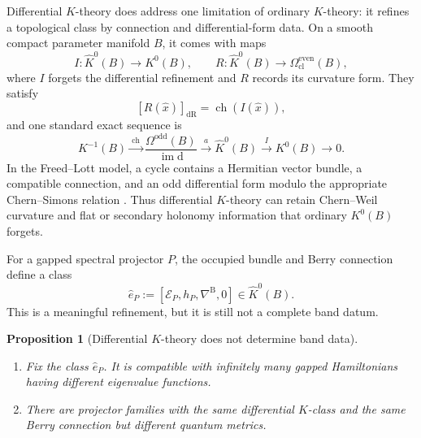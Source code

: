 \documentclass[11pt]{article}
\newtheorem{proposition}[theorem]{Proposition}
\theoremstyle{definition}
\theoremstyle{remark}
\newcommand{\ch}{\operatorname{ch}}
\newcommand{\dd}{\mathrm d}
\begin{document}
Differential \(K\)-theory does address one limitation of ordinary
\(K\)-theory: it refines a topological class by connection and
differential-form data.  On a smooth compact parameter manifold \(B\), it
comes with maps
\[
 I:\widehat K^0(B)\longrightarrow K^0(B),
 \qquad
 R:\widehat K^0(B)\longrightarrow
      \Omega_{\mathrm{cl}}^{\mathrm{even}}(B),
 \tag{9.8}\label{eq:differential-k-maps}
\]
where \(I\) forgets the differential refinement and \(R\) records its
curvature form.  They satisfy
\[
       [R(\widehat x)]_{\mathrm{dR}}
          =\ch\!\left(I(\widehat x)\right),
 \tag{9.9}\label{eq:differential-k-curvature}
\]
and one standard exact sequence is
\[
 K^{-1}(B)\xrightarrow{\ \ch\ }
 \frac{\Omega^{\mathrm{odd}}(B)}{\operatorname{im}\dd}
 \xrightarrow{\ a\ }\widehat K^0(B)
 \xrightarrow{\ I\ }K^0(B)\longrightarrow0.
 \tag{9.10}\label{eq:differential-k-sequence}
\]
In the Freed--Lott model, a cycle contains a Hermitian vector bundle, a
compatible connection, and an odd differential form modulo the appropriate
Chern--Simons relation \cite{FreedLott}.  Thus differential \(K\)-theory can
retain Chern--Weil curvature and flat or secondary holonomy information that
ordinary \(K^0(B)\) forgets.

For a gapped spectral projector \(P\), the occupied bundle and Berry
connection define a class
\[
 \widehat e_P
   :=[\mathscr E_P,h_P,\nabla^{\mathrm B},0]
      \in\widehat K^0(B).
 \tag{9.11}\label{eq:differential-band-class}
\]
This is a meaningful refinement, but it is still not a complete band datum.

\begin{proposition}[Differential \(K\)-theory does not determine band data]
\label{prop:differential-k-not-band}
\begin{enumerate}[label=\textup{(\alph*)},leftmargin=2.5em]
\item Fix the class \(\widehat e_P\).  It is compatible with infinitely
  many gapped Hamiltonians having different eigenvalue functions.
\item There are projector families with the same differential \(K\)-class
  and the same Berry connection but different quantum metrics.
\end{enumerate}
\end{proposition}
\end{document}
